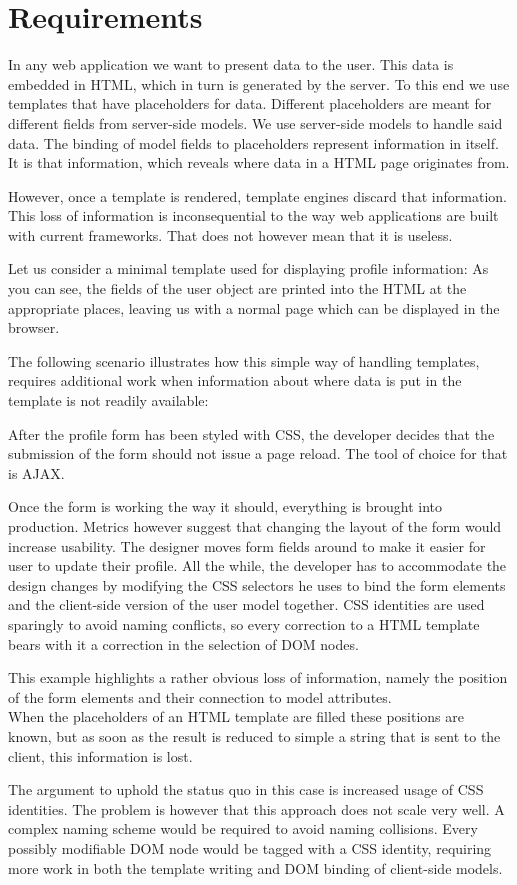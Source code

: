 \chapter{Requirements}
In any web application we want to present data to the user.
This data is embedded in HTML, which in turn is generated by the server.
To this end we use templates that have placeholders for data.
Different placeholders are meant for different fields from server-side models.
We use server-side models to handle said data.
The binding of model fields to placeholders represent information in
itself. It is that information, which reveals where data in a HTML page
originates from.

However, once a template is rendered, template engines discard that information.
This loss of information is inconsequential to the way web applications are
built with current frameworks. That does not however mean that it is useless.

Let us consider a minimal template used for displaying profile information:
\todo{\dots}
As you can see, the fields of the user object are printed into the HTML
at the appropriate places, leaving us with a normal page which can be
displayed in the browser.

The following scenario illustrates how this simple way of handling templates,
requires additional work when information about where data is put in the
template is not readily available:

\begin{shaded}
After the profile form has been styled with CSS, the developer decides that
the submission of the form should not issue a page reload. The tool of choice
for that is AJAX.

Once the form is working the way it should, everything is brought into
production. Metrics however suggest that changing the layout of the form would
increase usability.
The designer moves form fields around to make it easier for user to update
their profile.
All the while, the developer has to accommodate the design changes by modifying
the CSS selectors he uses to bind the form elements and the client-side version
of the user model together.
CSS identities are used sparingly to avoid naming conflicts, so every correction
to a HTML template bears with it a correction in the selection of DOM nodes.
\end{shaded}
This example highlights a rather obvious loss of information, namely
the position of the form elements and their connection to model attributes.\\
When the placeholders of an HTML template are filled these positions are known,
but as soon as the result is reduced to simple a string that is sent
to the client, this information is lost.

The argument to uphold the status quo in this case is increased usage of
CSS identities. The problem is however that this approach does not scale very well.
A complex naming scheme would be required to avoid naming collisions.
Every possibly modifiable DOM node would be tagged with a CSS identity,
requiring more work in both the template writing and DOM binding of
client-side models.
